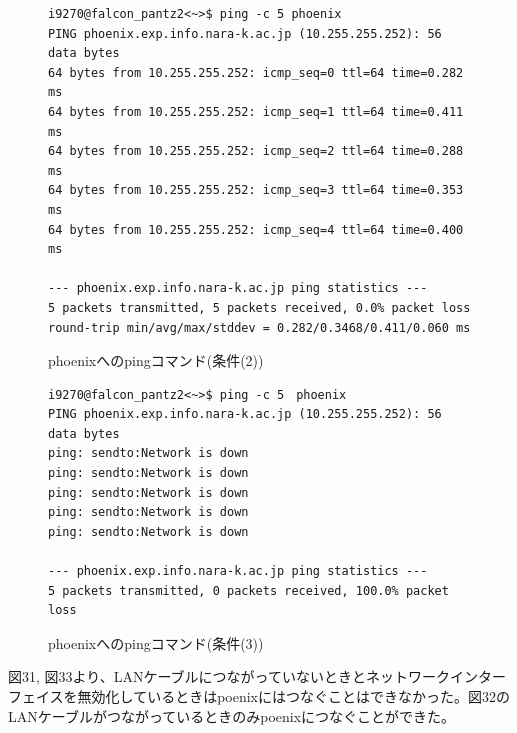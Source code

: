 \documentclass[12pt]{jreport}
\begin{document}
                \begin{figure}[H]
                    \begin{center}
                        \begin{screen}
                            \begin{verbatim}
i9270@falcon_pantz2<~>$ ping -c 5 phoenix
PING phoenix.exp.info.nara-k.ac.jp (10.255.255.252): 56 data bytes
64 bytes from 10.255.255.252: icmp_seq=0 ttl=64 time=0.282 ms
64 bytes from 10.255.255.252: icmp_seq=1 ttl=64 time=0.411 ms
64 bytes from 10.255.255.252: icmp_seq=2 ttl=64 time=0.288 ms
64 bytes from 10.255.255.252: icmp_seq=3 ttl=64 time=0.353 ms
64 bytes from 10.255.255.252: icmp_seq=4 ttl=64 time=0.400 ms

--- phoenix.exp.info.nara-k.ac.jp ping statistics ---
5 packets transmitted, 5 packets received, 0.0% packet loss
round-trip min/avg/max/stddev = 0.282/0.3468/0.411/0.060 ms
                            \end{verbatim}
                        \end{screen}
                        \caption{phoenixへのpingコマンド(条件(2))}
                        \label{32}
                    \end{center}
                \end{figure}
                \begin{figure}[H]
                    \begin{center}
                        \begin{screen}
                            \begin{verbatim}
i9270@falcon_pantz2<~>$ ping -c 5　phoenix
PING phoenix.exp.info.nara-k.ac.jp (10.255.255.252): 56 data bytes
ping: sendto:Network is down
ping: sendto:Network is down
ping: sendto:Network is down
ping: sendto:Network is down
ping: sendto:Network is down

--- phoenix.exp.info.nara-k.ac.jp ping statistics ---
5 packets transmitted, 0 packets received, 100.0% packet loss
                            \end{verbatim}
                        \end{screen}
                        \caption{phoenixへのpingコマンド(条件(3))}
                        \label{33}
                    \end{center}
                \end{figure}
                図31, 図33より、LANケーブルにつながっていないときとネットワークインターフェイスを無効化しているときはpoenixにはつなぐことはできなかった。図32のLANケーブルがつながっているときのみpoenixにつなぐことができた。
\end{document}
